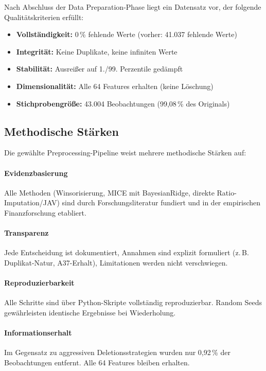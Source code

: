 Nach Abschluss der Data Preparation-Phase liegt ein Datensatz vor, der folgende Qualitätskriterien erfüllt:

\begin{itemize}[topsep=0.2\baselineskip]
    \item \textbf{Vollständigkeit:} 0\,\% fehlende Werte (vorher: 41.037 fehlende Werte)
    \item \textbf{Integrität:} Keine Duplikate, keine infiniten Werte
    \item \textbf{Stabilität:} Ausreißer auf 1./99. Perzentile gedämpft
    \item \textbf{Dimensionalität:} Alle 64 Features erhalten (keine Löschung)
    \item \textbf{Stichprobengröße:} 43.004 Beobachtungen (99,08\,\% des Originals)
\end{itemize}

\subsection{Methodische Stärken}

Die gewählte Preprocessing-Pipeline weist mehrere methodische Stärken auf:

\paragraph{Evidenzbasierung} Alle Methoden (Winsorisierung, MICE mit BayesianRidge, direkte Ratio-Imputation/JAV) sind durch Forschungsliteratur fundiert und in der empirischen Finanzforschung etabliert.

\paragraph{Transparenz} Jede Entscheidung ist dokumentiert, Annahmen sind explizit formuliert (z.\,B. Duplikat-Natur, A37-Erhalt), Limitationen werden nicht verschwiegen.

\paragraph{Reproduzierbarkeit} Alle Schritte sind über Python-Skripte vollständig reproduzierbar. Random Seeds gewährleisten identische Ergebnisse bei Wiederholung.

\paragraph{Informationserhalt} Im Gegensatz zu aggressiven Deletionsstrategien wurden nur 0,92\,\% der Beobachtungen entfernt. Alle 64 Features bleiben erhalten.

